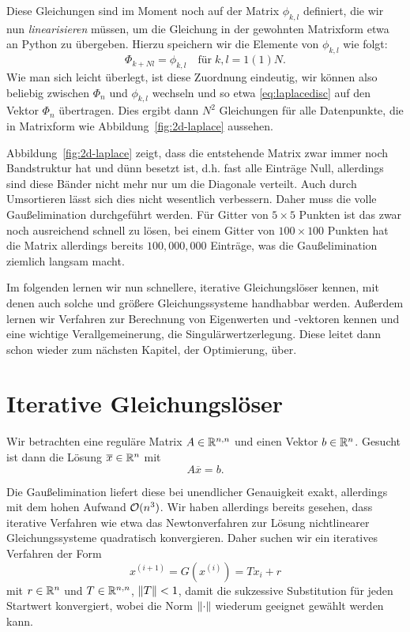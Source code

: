Diese Gleichungen sind im Moment noch auf der Matrix $\phi_{k,l}$
definiert, die wir nun \emph{linearisieren} müssen, um die Gleichung
in der gewohnten Matrixform etwa an Python zu übergeben. Hierzu
speichern wir die Elemente von $\phi_{k,l}$ wie folgt:
\begin{equation}
  \Phi_{k + N l} = \phi_{k,l} \quad\text{für}\; k,l=1(1)N.
\end{equation}
Wie man sich leicht überlegt, ist diese Zuordnung eindeutig, wir
können also beliebig zwischen $\Phi_n$ und $\phi_{k,l}$ wechseln und
so etwa \eqref{eq:laplacedisc} auf den Vektor $\Phi_n$
übertragen. Dies ergibt dann $N^2$ Gleichungen für alle Datenpunkte,
die in Matrixform wie Abbildung~\ref{fig:2d-laplace} aussehen.

Abbildung~\ref{fig:2d-laplace} zeigt, dass die entstehende Matrix zwar
immer noch Bandstruktur hat und dünn besetzt ist, d.h. fast alle
Einträge Null, allerdings sind diese Bänder nicht mehr nur um die
Diagonale verteilt. Auch durch Umsortieren lässt sich dies nicht
wesentlich verbessern. Daher muss die volle Gaußelimination
durchgeführt werden. Für Gitter von $5\times 5$ Punkten ist das zwar
noch ausreichend schnell zu lösen, bei einem Gitter von $100\times
100$ Punkten hat die Matrix allerdings bereits $100,000,000$ Einträge,
was die Gaußelimination ziemlich langsam macht.

Im folgenden lernen wir nun schnellere, iterative Gleichungslöser
kennen, mit denen auch solche und größere Gleichungssysteme handhabbar
werden. Außerdem lernen wir Verfahren zur Berechnung von Eigenwerten
und -vektoren kennen und eine wichtige Verallgemeinerung, die
Singulärwertzerlegung. Diese leitet dann schon wieder zum nächsten
Kapitel, der Optimierung, über.

\section{Iterative Gleichungslöser}

Wir betrachten eine reguläre Matrix $A\in\mathbb{R}^{n,n}$ und einen Vektor
$b\in\mathbb{R}^n$. Gesucht ist dann die Lösung $\overline{x}\in\mathbb{R}^n$ mit
\begin{equation}
  \label{eq:axb}
  A\overline{x} = b.
\end{equation}

Die Gaußelimination liefert diese bei unendlicher Genauigkeit exakt,
allerdings mit dem hohen Aufwand $\mathcal O(n^3)$. Wir haben allerdings
bereits gesehen, dass iterative Verfahren wie etwa das Newtonverfahren
zur Lösung nichtlinearer Gleichungssysteme quadratisch
konvergieren. Daher suchen wir ein iteratives Verfahren der Form
\begin{equation}
  \label{eq:itgl}
  x^{(i+1)} = G(x^{(i)}) = T x_i + r
\end{equation}
mit $r\in\mathbb{R}^n$ und $T\in\mathbb{R}^{n,n}$, $\left\lVert{T}\right\rVert<1$, damit die
sukzessive Substitution für jeden Startwert konvergiert, wobei die
Norm $\left\lVert{\cdot}\right\rVert$ wiederum geeignet gewählt werden kann.

